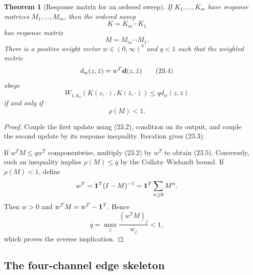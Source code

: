 \documentclass[11pt]{article}
\newtheorem{theorem}{Theorem}[section]
\theoremstyle{remark}
\begin{document}
\begin{theorem}[Response matrix for an ordered sweep]
\label{thm:v15v23-matrix}
If \(K_1,\ldots,K_m\) have response matrices
\(M_1,\ldots,M_m\), then the ordered sweep
\[
 K=K_m\cdots K_1
\]
has response matrix
\[
 M=M_m\cdots M_1.                                          \tag{23.3}
\]
There is a positive weight vector \(w\in(0,\infty)^k\) and
\(q<1\) such that the weighted metric
\[
 d_w(z,\bar z)=w^T{\bf d}(z,\bar z)                         \tag{23.4}
\]
obeys
\[
 W_{1,d_w}(K(z,\cdot),K(\bar z,\cdot))
 \le qd_w(z,\bar z)                                        \tag{23.5}
\]
if and only if
\[
 \rho(M)<1.                                                 \tag{23.6}
\]
\end{theorem}

\begin{proof}
Couple the first update using (23.2), condition on its output, and
couple the second update by its response inequality.  Iteration
gives (23.3).

If \(w^TM\le qw^T\) componentwise, multiply (23.2) by \(w^T\)
to obtain (23.5).  Conversely, such an inequality implies
\(\rho(M)\le q\) by the Collatz--Wielandt bound.  If
\(\rho(M)<1\), define
\[
 w^T={\bf 1}^T(I-M)^{-1}
 ={\bf 1}^T\sum_{n\ge0}M^n.
\]
Then \(w>0\) and \(w^TM=w^T-{\bf 1}^T\).  Hence
\[
 q=\max_j\frac{(w^TM)_j}{w_j}<1,
\]
which proves the reverse implication.
\end{proof}

\subsection{The four-channel edge skeleton}
\end{document}
